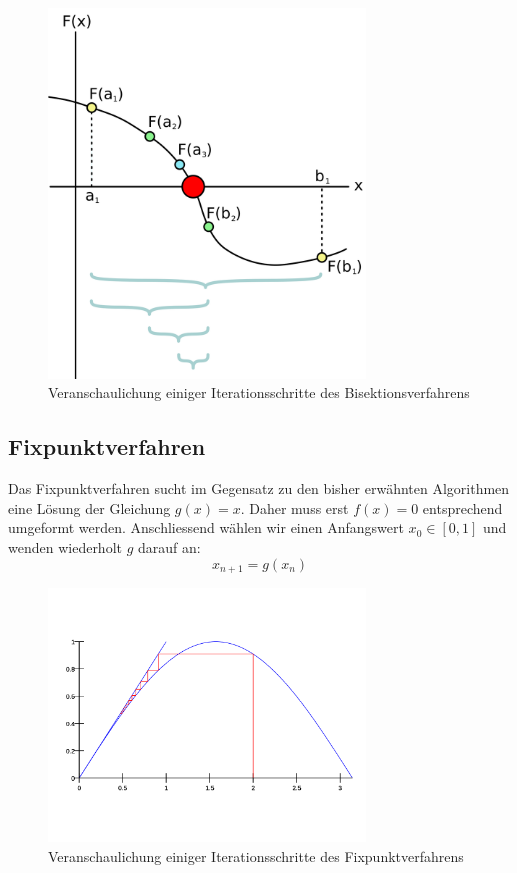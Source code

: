 \documentclass[a4paper,12pt]{article}
\newcommand{\1}{1\hspace{-0,9ex}1}
\begin{document}
\begin{figure}[H]
	\centering
	\includegraphics[width=0.75\textwidth]{plots/Bisection_method.png}
	\caption{Veranschaulichung einiger Iterationsschritte des Bisektionsverfahrens}
\end{figure}

\subsection*{Fixpunktverfahren}
Das Fixpunktverfahren sucht im Gegensatz zu den bisher erwähnten Algorithmen eine Lösung der Gleichung $g(x)=x$. Daher muss erst $f(x)=0$ entsprechend umgeformt werden. Anschliessend wählen wir einen Anfangswert $x_0\in[0,1]$ und wenden wiederholt $g$ darauf an:
\[
	x_{n+1}=g(x_n)
\]
\begin{figure}[H]
	\centering
	\includegraphics[width=0.75\textwidth]{plots/Sine_fixed_point.png}
	\caption{Veranschaulichung einiger Iterationsschritte des Fixpunktverfahrens}
\end{figure}
\newpage
\end{document}
